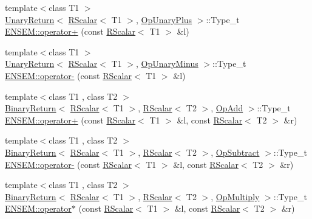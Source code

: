\begin{DoxyCompactItemize}
\item 
{\footnotesize template$<$class T1 $>$ }\\\mbox{\hyperlink{structENSEM_1_1UnaryReturn}{Unary\+Return}}$<$ \mbox{\hyperlink{classENSEM_1_1RScalar}{R\+Scalar}}$<$ T1 $>$, \mbox{\hyperlink{structENSEM_1_1OpUnaryPlus}{Op\+Unary\+Plus}} $>$\+::Type\+\_\+t \mbox{\hyperlink{group__rscalar_ga2ad5c813070059a7a12cee82d5e2bbae}{E\+N\+S\+E\+M\+::operator+}} (const \mbox{\hyperlink{classENSEM_1_1RScalar}{R\+Scalar}}$<$ T1 $>$ \&l)
\item 
{\footnotesize template$<$class T1 $>$ }\\\mbox{\hyperlink{structENSEM_1_1UnaryReturn}{Unary\+Return}}$<$ \mbox{\hyperlink{classENSEM_1_1RScalar}{R\+Scalar}}$<$ T1 $>$, \mbox{\hyperlink{structENSEM_1_1OpUnaryMinus}{Op\+Unary\+Minus}} $>$\+::Type\+\_\+t \mbox{\hyperlink{group__rscalar_ga2543f899f104b7784d528fadce2253e0}{E\+N\+S\+E\+M\+::operator-\/}} (const \mbox{\hyperlink{classENSEM_1_1RScalar}{R\+Scalar}}$<$ T1 $>$ \&l)
\item 
{\footnotesize template$<$class T1 , class T2 $>$ }\\\mbox{\hyperlink{structENSEM_1_1BinaryReturn}{Binary\+Return}}$<$ \mbox{\hyperlink{classENSEM_1_1RScalar}{R\+Scalar}}$<$ T1 $>$, \mbox{\hyperlink{classENSEM_1_1RScalar}{R\+Scalar}}$<$ T2 $>$, \mbox{\hyperlink{structENSEM_1_1OpAdd}{Op\+Add}} $>$\+::Type\+\_\+t \mbox{\hyperlink{group__rscalar_gac30d53b8acaa797f936d2b74a1fbf592}{E\+N\+S\+E\+M\+::operator+}} (const \mbox{\hyperlink{classENSEM_1_1RScalar}{R\+Scalar}}$<$ T1 $>$ \&l, const \mbox{\hyperlink{classENSEM_1_1RScalar}{R\+Scalar}}$<$ T2 $>$ \&r)
\item 
{\footnotesize template$<$class T1 , class T2 $>$ }\\\mbox{\hyperlink{structENSEM_1_1BinaryReturn}{Binary\+Return}}$<$ \mbox{\hyperlink{classENSEM_1_1RScalar}{R\+Scalar}}$<$ T1 $>$, \mbox{\hyperlink{classENSEM_1_1RScalar}{R\+Scalar}}$<$ T2 $>$, \mbox{\hyperlink{structENSEM_1_1OpSubtract}{Op\+Subtract}} $>$\+::Type\+\_\+t \mbox{\hyperlink{group__rscalar_ga22496c110ec4476e821ba39707b72b6f}{E\+N\+S\+E\+M\+::operator-\/}} (const \mbox{\hyperlink{classENSEM_1_1RScalar}{R\+Scalar}}$<$ T1 $>$ \&l, const \mbox{\hyperlink{classENSEM_1_1RScalar}{R\+Scalar}}$<$ T2 $>$ \&r)
\item 
{\footnotesize template$<$class T1 , class T2 $>$ }\\\mbox{\hyperlink{structENSEM_1_1BinaryReturn}{Binary\+Return}}$<$ \mbox{\hyperlink{classENSEM_1_1RScalar}{R\+Scalar}}$<$ T1 $>$, \mbox{\hyperlink{classENSEM_1_1RScalar}{R\+Scalar}}$<$ T2 $>$, \mbox{\hyperlink{structENSEM_1_1OpMultiply}{Op\+Multiply}} $>$\+::Type\+\_\+t \mbox{\hyperlink{group__rscalar_gadab7ad151ff9bea909186af226815d96}{E\+N\+S\+E\+M\+::operator$\ast$}} (const \mbox{\hyperlink{classENSEM_1_1RScalar}{R\+Scalar}}$<$ T1 $>$ \&l, const \mbox{\hyperlink{classENSEM_1_1RScalar}{R\+Scalar}}$<$ T2 $>$ \&r)

\end{DoxyCompactItemize}

